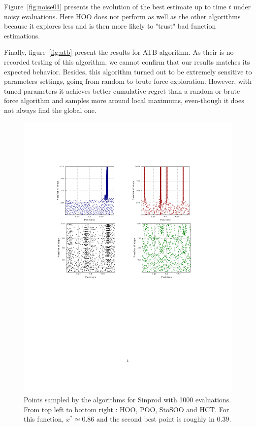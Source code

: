 \documentclass[a4paper,10pt]{article}
\begin{document}
Figure~\ref{fig:noise01} presents the evolution of the best estimate up to time $t$ under noisy evaluations. Here HOO does not perform as well as the other algorithms because it explores less and is then more likely to "trust" bad function estimations.

Finally, figure~\ref{fig:atb} present the results for ATB algorithm. As their is no recorded testing of this algorithm, we cannot confirm that our results matches its expected behavior. Besides, this algorithm turned out to be extremely sensitive to parameters settings, going from random to brute force exploration. However, with tuned parameters it achieves better cumulative regret than a random or brute force algorithm and samples more around local maximums, even-though it does not always find the global one.


\begin{figure}
\label{fig:position1000}
\hspace{-5cm}\includegraphics[trim = {0 6cm 0 4cm},clip]{marginal1000.pdf}
  \caption{Points sampled by the algorithms for Sinprod with 1000 evaluations. From top left to bottom right : HOO, POO, StoSOO and HCT. For this function, $x^*\simeq 0.86$ and the second best point is roughly in $0.39$.}
\end{figure}
\end{document}
